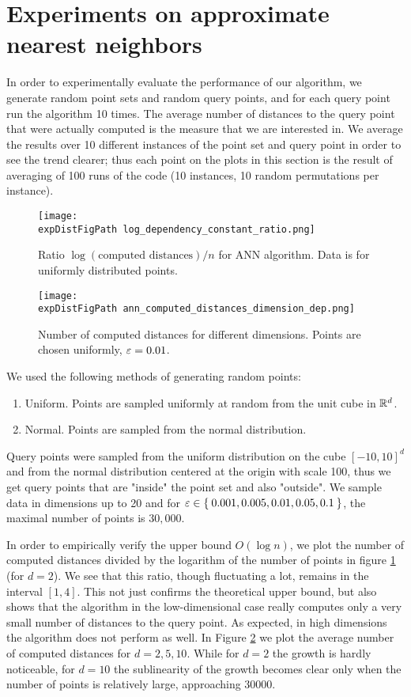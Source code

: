 \documentclass[a4paper,UKenglish,cleveref, autoref]{lipics-v2019}
\def \expDistFigPath {pics/}
\begin{document}
\section{Experiments on approximate nearest neighbors}

In order to experimentally evaluate the performance of our algorithm,
we generate random point sets and random query points, and for each query point
run the algorithm 10 times. The average number of distances to the query point
that were actually computed is the measure that we are interested in.
We average the results over 10 different instances of the point
set and query point in order to see the trend clearer; thus
each point on the plots in this section is the result of averaging of 100 runs
of the code (10 instances, 10 random permutations per instance).

\begin{figure}[ht]
    \texttt{[image: \\expDistFigPath log\_dependency\_constant\_ratio.png]}
    \caption{Ratio $\log(\mbox{computed distances}) / n$ for ANN algorithm. Data is for uniformly distributed
    points.}
    \label{fig:ann_const_ratio}
\end{figure}

\begin{figure}[ht]
    \texttt{[image: \\expDistFigPath ann\_computed\_distances\_dimension\_dep.png]}
    \caption{Number of computed distances for different dimensions. Points are chosen uniformly, $\varepsilon = 0.01$.}
    \label{fig:ann_dimension_dependence}
\end{figure}


We used the following methods of generating random points:
\begin{enumerate}
    \item Uniform. Points are sampled uniformly at random from the unit cube in $\mathbb{R}^d$.
    \item Normal. Points are sampled from the normal distribution.
\end{enumerate}
Query points were sampled from the uniform distribution on the cube $[-10, 10]^d$
and from the normal distribution centered at the origin with scale 100,
thus we get query points that are "inside" the point set and also "outside".
We sample data in dimensions up to 20 and for $\varepsilon \in \Set{0.001, 0.005, 0.01, 0.05, 0.1}$,
the maximal number of points is $30,000$.

In order to empirically verify the upper bound $O(\log n)$,
we plot the number of computed distances divided
by the logarithm of the number of points in figure \ref{fig:ann_const_ratio} (for $d = 2$).
We see that this ratio, though fluctuating a lot, remains in the interval $[1,4]$. This not just confirms
the theoretical upper bound, but also shows that the algorithm in the low-dimensional case
really computes only a very small number of distances to the query point.
As expected, in high dimensions the algorithm does not perform as well.
In Figure \ref{fig:ann_dimension_dependence} we plot the average number of computed distances
for $d = 2, 5, 10$. While for $d = 2$ the growth is hardly noticeable, for $d = 10$
the sublinearity of the growth becomes clear only when the number of points is relatively large,
approaching 30000.
\end{document}
